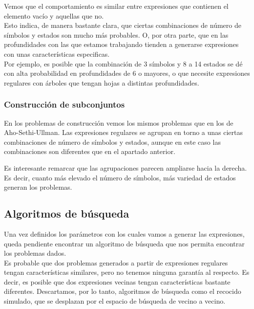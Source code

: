 
Vemos que el comportamiento es similar entre expresiones que contienen el elemento vacío y aquellas que no.
\\
Esto indica, de manera bastante clara, que ciertas combinaciones de número de símbolos y estados son mucho más probables.
O, por otra parte, que en las profundidades con las que estamos trabajando tienden a generarse expresiones con unas características especificas.
\\
Por ejemplo, es posible que la combinación de 3 símbolos y 8 a 14 estados se dé con alta probabilidad en profundidades de 6 o mayores, o que necesite expresiones regulares con árboles que tengan hojas a distintas profundidades.

\subsubsection{Construcción de subconjuntos}

En los problemas de construcción vemos los mismos problemas que en los de Aho-Sethi-Ullman.
Las expresiones regulares se agrupan en torno a unas ciertas combinaciones de número de símbolos y estados, aunque en este caso las combinaciones son diferentes que en el apartado anterior.


Es interesante remarcar que las agrupaciones parecen ampliarse hacia la derecha.
Es decir, cuanto más elevado el número de símbolos, más variedad de estados generan los problemas.

\subsection{Algoritmos de búsqueda}

Una vez definidos los parámetros con los cuales vamos a generar las expresiones, queda pendiente encontrar un algoritmo de búsqueda que nos permita encontrar los problemas dados.
\\
Es probable que dos problemas generados a partir de expresiones regulares tengan características similares, pero no tenemos ninguna garantía al respecto.
Es decir, es posible que dos expresiones vecinas tengan características bastante diferentes.
Descartamos, por lo tanto, algoritmos de búsqueda como el recocido simulado, que se desplazan por el espacio de búsqueda de vecino a vecino.

